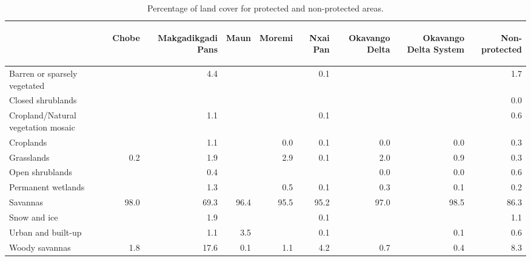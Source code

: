 \begin{table}[H]
\centering
\caption[Percentage of LC 
                                           for protected and non-protected 
                                           areas, NA]{Percentage of land cover 
                                           for protected and non-protected 
                                           areas.} 
\label{table:mlc_percentage_wdpa_NA}
\begin{tabular}{lrrrrrrrr}
  \toprule
\begin{sideways}  \end{sideways} & \begin{sideways} Chobe \end{sideways} & \begin{sideways} Makgadikgadi Pans \end{sideways} & \begin{sideways} Maun \end{sideways} & \begin{sideways} Moremi \end{sideways} & \begin{sideways} Nxai Pan \end{sideways} & \begin{sideways} Okavango Delta \end{sideways} & \begin{sideways} Okavango Delta System \end{sideways} & \begin{sideways} Non-protected \end{sideways} \\ 
  \midrule
Barren or sparsely vegetated &  & 4.4 &  &  & 0.1 &  &  & 1.7 \\ 
  Closed shrublands &  &  &  &  &  &  &  & 0.0 \\ 
  Cropland/Natural vegetation mosaic &  & 1.1 &  &  & 0.1 &  &  & 0.6 \\ 
  Croplands &  & 1.1 &  & 0.0 & 0.1 & 0.0 & 0.0 & 0.3 \\ 
  Grasslands & 0.2 & 1.9 &  & 2.9 & 0.1 & 2.0 & 0.9 & 0.3 \\ 
  Open shrublands &  & 0.4 &  &  &  & 0.0 & 0.0 & 0.6 \\ 
  Permanent wetlands &  & 1.3 &  & 0.5 & 0.1 & 0.3 & 0.1 & 0.2 \\ 
  Savannas & 98.0 & 69.3 & 96.4 & 95.5 & 95.2 & 97.0 & 98.5 & 86.3 \\ 
  Snow and ice &  & 1.9 &  &  & 0.1 &  &  & 1.1 \\ 
  Urban and built-up &  & 1.1 & 3.5 &  & 0.1 &  & 0.1 & 0.6 \\ 
  Woody savannas & 1.8 & 17.6 & 0.1 & 1.1 & 4.2 & 0.7 & 0.4 & 8.3 \\ 
   \bottomrule
\end{tabular}
\end{table}
